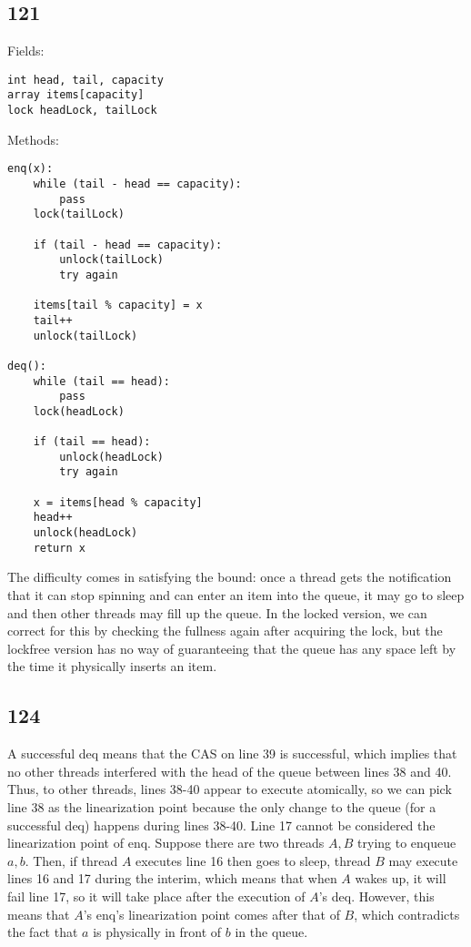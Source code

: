 \documentclass{article}
\begin{document}
\subsection*{121}
Fields:
\begin{verbatim}
int head, tail, capacity
array items[capacity]
lock headLock, tailLock
\end{verbatim}

Methods:
\begin{verbatim}
enq(x):
    while (tail - head == capacity):
        pass
    lock(tailLock)

    if (tail - head == capacity):
        unlock(tailLock)
        try again

    items[tail % capacity] = x
    tail++
    unlock(tailLock)

deq():
    while (tail == head):
        pass
    lock(headLock)

    if (tail == head):
        unlock(headLock)
        try again

    x = items[head % capacity]
    head++
    unlock(headLock)
    return x
\end{verbatim}

The difficulty comes in satisfying the bound: once a thread gets the notification that it can stop spinning and can enter an item into the queue, it may go to sleep and then other threads may fill up the queue. In the locked version, we can correct for this by checking the fullness again after acquiring the lock, but the lockfree version has no way of guaranteeing that the queue has any space left by the time it physically inserts an item.
\subsection*{124}
A successful deq means that the CAS on line 39 is successful, which implies that no other threads interfered with the head of the queue between lines 38 and 40. Thus, to other threads, lines 38-40 appear to execute atomically, so we can pick line 38 as the linearization point because the only change to the queue (for a successful deq) happens during lines 38-40.
Line 17 cannot be considered the linearization point of enq. Suppose there are two threads $A, B$ trying to enqueue $a, b$. Then, if thread $A$ executes line 16 then goes to sleep, thread $B$ may execute lines 16 and 17 during the interim, which means that when $A$ wakes up, it will fail line 17, so it will take place after the execution of $A$'s deq. However, this means that $A$'s enq's linearization point comes after that of $B$, which contradicts the fact that $a$ is physically in front of $b$ in the queue.
\end{document}
